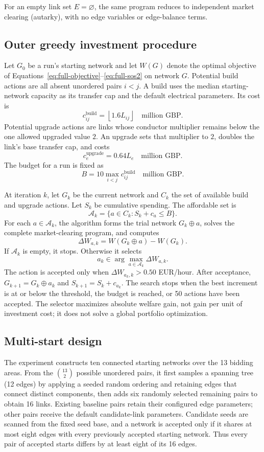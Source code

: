 \documentclass[11pt]{article}
\begin{document}
For an empty link set \(E=\varnothing\), the same program reduces to independent
market clearing (autarky), with no edge variables or edge-balance terms.

\subsection{Outer greedy investment procedure}

Let \(G_0\) be a run's starting network and let \(W(G)\) denote the optimal
objective of Equations~\ref{eq:full-objective}--\ref{eq:full-sos2} on network
\(G\). Potential build actions are all absent unordered pairs \(i<j\). A build
uses the median starting-network capacity as its transfer cap and the default
electrical parameters. Its cost is
\[
c^{\mathrm{build}}_{ij}
=\left\lfloor1.6L_{ij}\right\rfloor
\quad\text{million GBP}.
\]
Potential upgrade actions are links whose conductor multiplier remains below
the one allowed upgraded value \(2\). An upgrade sets that multiplier to \(2\),
doubles the link's base transfer cap, and costs
\[
c^{\mathrm{upgrade}}_e=0.64L_e
\quad\text{million GBP}.
\]
The budget for a run is fixed as
\[
B=10\max_{i<j}c^{\mathrm{build}}_{ij}
\quad\text{million GBP}.
\]

At iteration \(k\), let \(G_k\) be the current network and \(C_k\) the set of
available build and upgrade actions. Let \(S_k\) be cumulative spending. The
affordable set is
\[
\mathcal{A}_k=\{a\in C_k:S_k+c_a\le B\}.
\]
For each \(a\in\mathcal{A}_k\), the algorithm forms the trial network
\(G_k\oplus a\), solves the complete market-clearing program, and computes
\[
\Delta W_{a,k}=W(G_k\oplus a)-W(G_k).
\]
If \(\mathcal{A}_k\) is empty, it stops. Otherwise it selects
\[
a_k\in\arg\max_{a\in\mathcal{A}_k}\Delta W_{a,k}.
\]
The action is accepted only when \(\Delta W_{a_k,k}>0.50\) EUR/hour. After
acceptance, \(G_{k+1}=G_k\oplus a_k\) and
\(S_{k+1}=S_k+c_{a_k}\). The search stops when the best increment is at or
below the threshold, the budget is reached, or 50 actions have been accepted.
The selector maximizes absolute welfare gain, not gain per unit of investment
cost; it does not solve a global portfolio optimization.

\subsection{Multi-start design}

The experiment constructs ten connected starting networks over the 13 bidding
areas. From the \(\binom{13}{2}\) possible unordered pairs, it first samples a
spanning tree (12 edges) by applying a seeded random ordering and retaining
edges that connect distinct components, then adds six randomly selected
remaining pairs to obtain 16 links. Existing baseline pairs retain their
configured edge parameters; other pairs receive the default candidate-link
parameters. Candidate seeds are scanned from the fixed seed base, and a
network is accepted only if it shares at most eight edges with every previously
accepted starting network. Thus every pair of accepted starts differs by at
least eight of its 16 edges.
\end{document}
